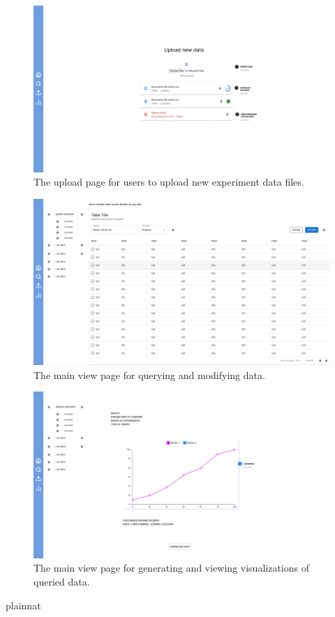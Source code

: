 \documentclass[12pt, titlepage]{article}
\begin{document}
\begin{figure}[htbp]
  \centering
  \includegraphics[width=\textwidth]{Figma/upload.pdf}
  \caption{The upload page for users to upload new experiment data files.}
  \label{fig:FigUIUP}
\end{figure}

\begin{figure}[htbp]
  \centering
  \includegraphics[width=\textwidth]{Figma/table.pdf}
  \caption{The main view page for querying and modifying data.}
  \label{fig:FigUITB}
\end{figure}

\begin{figure}[htbp]
  \centering
  \includegraphics[width=\textwidth]{Figma/graphs.pdf}
  \caption{The main view page for generating and viewing visualizations of queried data.}
  \label{fig:FigUIG}
\end{figure}

 {plainnat}


\newpage{}
\end{document}
